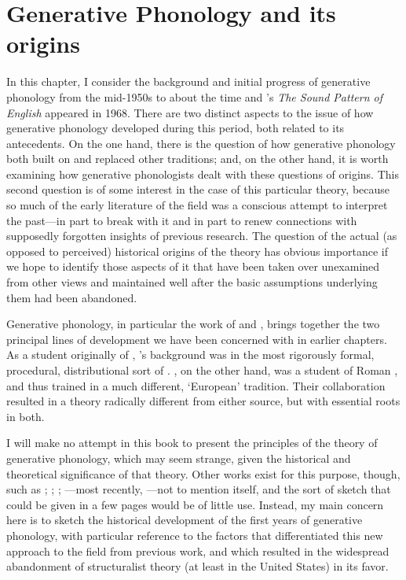 \chapter{Generative Phonology and its origins}
\label{ch.genphon}

In this chapter, I consider the background and initial progress of
generative phonology from the mid-1950s to about the time {\Chomsky} and
{\Halle}'s \textsl{The Sound Pattern of English} appeared in 1968. There
are two distinct aspects to the issue of how generative phonology
developed during this period, both related to its antecedents. On the
one hand, there is the question of how generative phonology both built
on and replaced other traditions; and, on the other hand, it is worth
examining how generative phonologists dealt with these questions of
origins. This second question is of some interest in the case of this
particular theory, because so much of the early literature of the
field was a conscious attempt to interpret the past—in part to break
with it and in part to renew connections with supposedly forgotten
insights of previous research. The question of the actual (as opposed
to perceived) historical origins of the theory has obvious importance
if we hope to identify those aspects of it that have been taken over
unexamined from other views and maintained well after the basic
assumptions underlying them had been abandoned.

Generative phonology, in particular the work of  and
, brings together the two principal lines of development
we have been concerned with in earlier chapters. As a student
originally of , {\Chomsky}'s background was in the most
rigorously formal, procedural, distributional sort of . {\Halle}, on the other hand, was a student of Roman
{\Jakobson}, and thus trained in a much different, `European'
tradition. Their collaboration resulted in a theory radically
different from either source, but with essential roots in both.

I will make no attempt in this book to present the principles of the
theory of generative phonology, which may seem strange, given the
historical and theoretical significance of that theory. Other works
exist for this purpose, though, such as
\citealt{goyvaerts.pullum75:essays.on.spe};
\citealt{hyman75:phonology};
\citealt{kenstowicz.kisseberth79:gen.phon};
\citealt{sommerstein77:mod.phon}—most recently,
\citealt{kenstowicz21:spe}---not to mention \citealt{spe} itself, and
the sort of sketch that could be given in a few pages would be of
little use. Instead, my main concern here is to sketch the historical
development of the first years of generative phonology, with
particular reference to the factors that differentiated this new
approach to the field from previous work, and which resulted in the
widespread abandonment of structuralist theory (at least in the United
States) in its favor.

